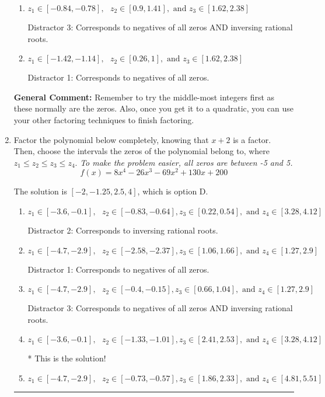 \documentclass{extbook}[14pt]
\newcommand{\litem}[1]{\item #1

\rule{\textwidth}{0.4pt}}
\begin{document}
\begin{enumerate}
{\begin{enumerate}[label=\Alph*.]
 Distractor 4: Corresponds to moving factors from one rational to another.
\item \( z_1 \in [-0.84, -0.78], \text{   }  z_2 \in [0.9, 1.41], \text{   and   } z_3 \in [1.62, 2.38] \)

 Distractor 3: Corresponds to negatives of all zeros AND inversing rational roots.
\item \( z_1 \in [-1.42, -1.14], \text{   }  z_2 \in [0.26, 1], \text{   and   } z_3 \in [1.62, 2.38] \)

 Distractor 1: Corresponds to negatives of all zeros.
\end{enumerate}

\textbf{General Comment:} Remember to try the middle-most integers first as these normally are the zeros. Also, once you get it to a quadratic, you can use your other factoring techniques to finish factoring.
}
\litem{
Factor the polynomial below completely, knowing that $x+2$ is a factor. Then, choose the intervals the zeros of the polynomial belong to, where $z_1 \leq z_2 \leq z_3 \leq z_4$. \textit{To make the problem easier, all zeros are between -5 and 5.}
\[ f(x) = 8x^{4} -26 x^{3} -69 x^{2} +130 x + 200 \]

The solution is \( [-2, -1.25, 2.5, 4] \), which is option D.\begin{enumerate}[label=\Alph*.]
\item \( z_1 \in [-3.6, -0.1], \text{   }  z_2 \in [-0.83, -0.64], z_3 \in [0.22, 0.54], \text{   and   } z_4 \in [3.28, 4.12] \)

 Distractor 2: Corresponds to inversing rational roots.
\item \( z_1 \in [-4.7, -2.9], \text{   }  z_2 \in [-2.58, -2.37], z_3 \in [1.06, 1.66], \text{   and   } z_4 \in [1.27, 2.9] \)

 Distractor 1: Corresponds to negatives of all zeros.
\item \( z_1 \in [-4.7, -2.9], \text{   }  z_2 \in [-0.4, -0.15], z_3 \in [0.66, 1.04], \text{   and   } z_4 \in [1.27, 2.9] \)

 Distractor 3: Corresponds to negatives of all zeros AND inversing rational roots.
\item \( z_1 \in [-3.6, -0.1], \text{   }  z_2 \in [-1.33, -1.01], z_3 \in [2.41, 2.53], \text{   and   } z_4 \in [3.28, 4.12] \)

* This is the solution!
\item \( z_1 \in [-4.7, -2.9], \text{   }  z_2 \in [-0.73, -0.57], z_3 \in [1.86, 2.33], \text{   and   } z_4 \in [4.81, 5.51] \)


\end{enumerate}}
\end{enumerate}
\end{document}
